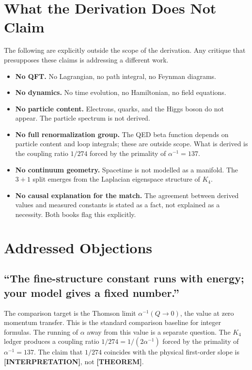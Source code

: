 \documentclass[11pt,a4paper]{article}
\newcommand{\THEOREM}{\textcolor{blue!70!black}{\textbf{[THEOREM]}}}
\newcommand{\INTERP}{\textcolor{orange!80!black}{\textbf{[INTERPRETATION]}}}
\theoremstyle{definition}
\begin{document}
\section{What the Derivation Does Not Claim}
\label{sec:nonclaims}

The following are explicitly outside the scope of the derivation.  Any
critique that presupposes these claims is addressing a different work.

\begin{itemize}[nosep, leftmargin=1.4em]
\item \textbf{No QFT.}  No Lagrangian, no path integral, no Feynman diagrams.
\item \textbf{No dynamics.}  No time evolution, no Hamiltonian, no field equations.
\item \textbf{No particle content.}  Electrons, quarks, and the Higgs boson do not
  appear.  The particle spectrum is not derived.
\item \textbf{No full renormalization group.}  The QED beta function depends on
  particle content and loop integrals; these are outside scope.  What is derived
  is the coupling ratio $1/274$ forced by the primality of $\alpha^{-1} = 137$.
\item \textbf{No continuum geometry.}  Spacetime is not modelled as a manifold.
  The $3{+}1$ split emerges from the Laplacian eigenspace structure of $K_4$.
\item \textbf{No causal explanation for the match.}  The agreement between derived
  values and measured constants is stated as a fact, not explained as a necessity.
  Both books flag this explicitly.
\end{itemize}

\section{Addressed Objections}
\label{sec:objections}

\subsection*{``The fine-structure constant runs with energy; your model gives a fixed number.''}

The comparison target is the Thomson limit $\alpha^{-1}(Q \to 0)$, the value at
zero momentum transfer.  This is the standard comparison baseline for integer
formulas.  The running of $\alpha$ away from this value is a separate question.
The $K_4$ ledger produces a coupling ratio $1/274 = 1/(2\alpha^{-1})$ forced by
the primality of $\alpha^{-1} = 137$.
The claim that $1/274$ coincides with the physical first-order slope is
\INTERP, not \THEOREM.
\end{document}
